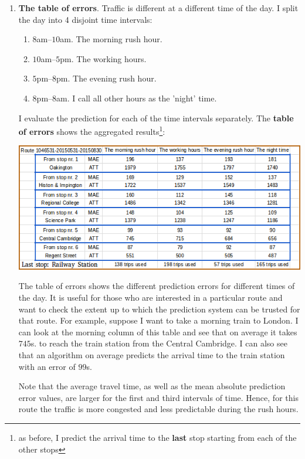 \documentclass[12pt,a4paper,oneside,openright]{report}
\begin{document}
\begin{enumerate}

\item[(iii)] \textbf{The table of errors}. Traffic is different at a different time of
the day. I split the day into 4 disjoint time intervals:

\begin{enumerate}
\item[1.] $8$am--$10$am. The morning rush hour.
\item[2.] $10$am--$5$pm. The working hours.
\item[2.] $5$pm--$8$pm. The evening rush hour.
\item[3.] $8$pm--$8$am. I call all other hours as the 'night' time.



\end{enumerate}

I evaluate the prediction for each of the time intervals separately. The 
\textbf{table of errors} shows the aggregated results\footnote{as before,
I predict the arrival time to the \textbf{last} stop starting from each of the
other stops}:

\includegraphics[width=\textwidth]{figs/table_of_times.png}

The table of errors shows the different prediction errors for different
times of the day. It is useful for those who are interested in a
particular route and want to check the extent up to which the prediction system 
can be trusted for that route. For example, suppose I want to take a morning train
to London. I can look at the morning column of this table and see that on average
it takes $745$s. to reach the train station from the Central Cambridge. I can
also see that an algorithm on average predicts the arrival time to the train station
with an error of $99$s.

Note that the average travel time, as well as the mean absolute
prediction error values, are larger for the first and third intervals of time.
Hence, for this route the traffic is more congested and less predictable
during the rush hours.

\end{enumerate}
\end{document}
